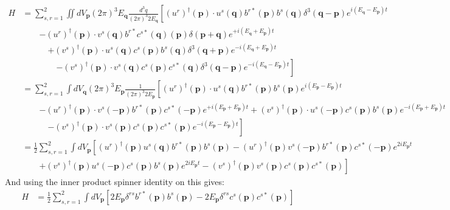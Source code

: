 \documentclass[12pt,a4]{article}
\begin{document}
\begin{enumerate}
\begin{align*}
      H &= \sum_{s,r = 1}^2 \iint d V_\mathbf{p} (2 \pi)^3 E_\mathbf{q} \frac{d^3q}{(2\pi)^3 2E_\mathbf{q}}  \left[(u^r)^\dagger(\mathbf{p}) \cdot u^s(\mathbf{q}) b ^{r*} (\mathbf{p}) b ^s (\mathbf{q}) \delta^3(\mathbf{q} - \mathbf{p})e^{i (E_\mathbf{q} - E_\mathbf{p})t}  \right.\\
        & \qquad \left. - (u^r)^\dagger(\mathbf{p}) \cdot v^s(\mathbf{q}) b ^{r*} c ^{s*} (\mathbf{q}) (\mathbf{p})\delta(\mathbf{p} + \mathbf{q})e^{+ i (E_\mathbf{q} + E_\mathbf{p}) t} \right. \\
        & \qquad \quad \left. + (v^{s})^\dagger(\mathbf{p}) \cdot u^s(\mathbf{q}) c ^{s} (\mathbf{p}) b ^s (\mathbf{q})\delta^3(\mathbf{q} + \mathbf{p})e^{- i (E_\mathbf{q} + E_\mathbf{p}) t}\right.\\
        & \qquad \qquad \left. - (v^{s})^\dagger(\mathbf{p}) \cdot v^s(\mathbf{q}) c ^{s} (\mathbf{p}) c ^{s*} (\mathbf{q}) \delta^3(\mathbf{q} - \mathbf{p}) e^{- i (E_\mathbf{q} - E_\mathbf{p})t}\right] \\
        &= \sum_{s,r = 1}^2 \int d V_\mathbf{q} (2 \pi)^3 E_\mathbf{p} \frac{1}{(2\pi)^3 2E_\mathbf{p}}  \left[(u^r)^\dagger(\mathbf{p}) \cdot u^s(\mathbf{q}) b ^{r*} (\mathbf{p}) b ^s (\mathbf{p})e^{i (E_\mathbf{p} - E_\mathbf{p})t}  \right.\\
        & \qquad \left. - (u^r)^\dagger(\mathbf{p}) \cdot v^s(\mathbf{-p}) b ^{r*} (\mathbf{p})c ^{s*} (-\mathbf{p}) e^{+ i (E_\mathbf{p} + E_\mathbf{p}) t} + (v^{s})^\dagger(\mathbf{p}) \cdot u^s(-\mathbf{p}) c ^{s} (\mathbf{p}) b ^s (\mathbf{p})e^{- i (E_\mathbf{p} + E_\mathbf{p}) t}\right.\\
        & \qquad \quad \left. - (v^{s})^\dagger(\mathbf{p}) \cdot v^s(\mathbf{p}) c ^{s} (\mathbf{p}) c ^{s*} (\mathbf{p}) e^{- i (E_\mathbf{p} - E_\mathbf{p})t}\right] \\
        &= \frac{1}{2} \sum_{s,r = 1}^2 \int d V_\mathbf{p}   \left[(u^r)^\dagger(\mathbf{p}) u^s(\mathbf{q}) b ^{r*} (\mathbf{p}) b ^s (\mathbf{p}) - (u^r)^\dagger(\mathbf{p}) v^s(\mathbf{-p}) b ^{r*} (\mathbf{p})c ^{s*} (-\mathbf{p}) e^{2 i E_\mathbf{p} t}  \right.\\
        & \qquad \left. + (v^{s})^\dagger(\mathbf{p}) u^s(-\mathbf{p}) c ^{s} (\mathbf{p}) b ^s (\mathbf{p})e^{2 i E_\mathbf{p} t} - (v^{s})^\dagger(\mathbf{p}) v^s(\mathbf{p}) c ^{s} (\mathbf{p}) c ^{s*} (\mathbf{p}) \right] 
    \end{align*}
    And using the inner product spinner identity on this gives:
    \begin{align}
      H &= \frac{1}{2} \sum_{s,r = 1}^2 \int d V_\mathbf{p}   \left[2 E_\mathbf{p} \delta^{rs} b ^{r*} (\mathbf{p}) b ^s (\mathbf{p}) - 2 E_\mathbf{p} \delta^{rs} c ^{s} (\mathbf{p}) c ^{s*} (\mathbf{p}) \right] \nonumber\\

\end{align}
\end{enumerate}
\end{document}

